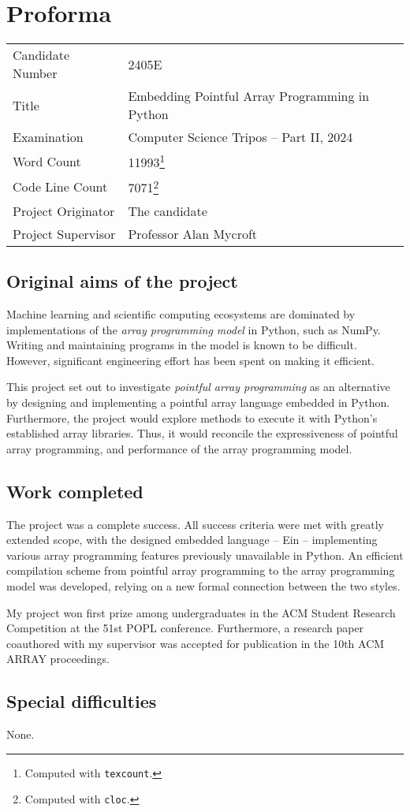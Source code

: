 \section*{Proforma}
\begin{tabular}{ll}
    Candidate Number & 2405E \\
    Title & Embedding Pointful Array Programming in Python \\ 
    Examination & Computer Science Tripos -- Part II, 2024 \\
    Word Count & 11993\footnote{Computed with \texttt{texcount}.} \\
    Code Line Count & 7071\footnote{Computed with \texttt{cloc}.} \\
    Project Originator & The candidate \\
    Project Supervisor & Professor Alan Mycroft \\
\end{tabular}

\subsection*{Original aims of the project}
Machine learning and scientific computing ecosystems are dominated by implementations of the \textit{array programming model} in Python, such as NumPy.
Writing and maintaining programs in the model is known to be difficult.
However, significant engineering effort has been spent on making it efficient.

This project set out to investigate \textit{pointful array programming} as an alternative by designing and implementing a pointful array language embedded in Python. 
Furthermore, the project would explore methods to execute it with Python's established array libraries. 
Thus, it would reconcile the expressiveness of pointful array programming, and performance of the array programming model.

\subsection*{Work completed}

The project was a complete success. All success criteria were met with greatly extended scope, with the designed embedded language -- Ein -- implementing various array programming features previously unavailable in Python. An efficient compilation scheme from pointful array programming to the array programming model was developed, relying on a new formal connection between the two styles. 

My project won first prize among undergraduates in the ACM Student Research Competition at the 51st POPL conference. Furthermore, a research paper coauthored with my supervisor was accepted for publication in the 10th ACM ARRAY proceedings.

\subsection*{Special difficulties}
None.
